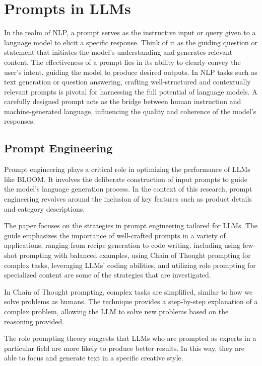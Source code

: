 \section{Prompts in LLMs}

In the realm of NLP, a prompt serves as the instructive input or query given to a language model to elicit a specific response. Think of it as the guiding question or statement that initiates the model's understanding and generates relevant content. The effectiveness of a prompt lies in its ability to clearly convey the user's intent, guiding the model to produce desired outputs. In NLP tasks such as text generation or question answering, crafting well-structured and contextually relevant prompts is pivotal for harnessing the full potential of language models. A carefully designed prompt acts as the bridge between human instruction and machine-generated language, influencing the quality and coherence of the model's responses.

\subsection{Prompt Engineering}

Prompt engineering plays a critical role in optimizing the performance of LLMs like BLOOM. It involves the deliberate construction of input prompts to guide the model's language generation process. In the context of this research, prompt engineering revolves around the inclusion of key features such as product details and category descriptions.

The paper \cite{gaoprompt} focuses on the strategies in prompt engineering tailored for LLMs. The guide emphasizes the importance of well-crafted prompts in a variety of applications, ranging from recipe generation to code writing. including using few-shot prompting with balanced examples, using Chain of Thought prompting for complex tasks, leveraging LLMs' coding abilities, and utilizing role prompting for specialized content are some of the strategies that are investigated.

In Chain of Thought prompting, complex tasks are simplified, similar to how we solve problems as humans. The technique provides a step-by-step explanation of a complex problem, allowing the LLM to solve new problems based on the reasoning provided.

The role prompting theory suggests that LLMs who are prompted as experts in a particular field are more likely to produce better results. In this way, they are able to focus and generate text in a specific creative style.

